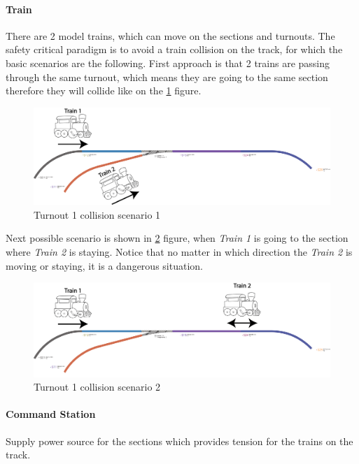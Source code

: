 \paragraph{Train} \label{par:trainScenarios}
There are 2 model trains, which can move on the sections and turnouts. The safety critical paradigm is to avoid a train collision on the track, for which the basic scenarios are the following. 
First approach is that 2 trains are passing through the same turnout, which means they are going to the same section therefore they will collide like on the \ref{fig:LayoutT1-scenario1} figure.
\begin{figure}[!h]
	\centering
	\includegraphics[width=150mm, keepaspectratio]{figures/modes3/layoutT1-scenario1.png}
	\caption{Turnout 1 collision scenario 1}
	\label{fig:LayoutT1-scenario1}
\end{figure}
Next possible scenario is shown in \ref{fig:LayoutT1-scenario2} figure, when \textit{Train 1} is going to the section where \textit{Train 2} is staying. Notice that no matter in which direction the \textit{Train 2} is moving or staying, it is a dangerous situation.
\begin{figure}[!h]
	\centering
	\includegraphics[width=150mm, keepaspectratio]{figures/modes3/layoutT1-scenario2.png}
	\caption{Turnout 1 collision scenario 2}
	\label{fig:LayoutT1-scenario2}
\end{figure}

\paragraph{Command Station}
Supply power source for the sections which provides tension for the trains on the track.
